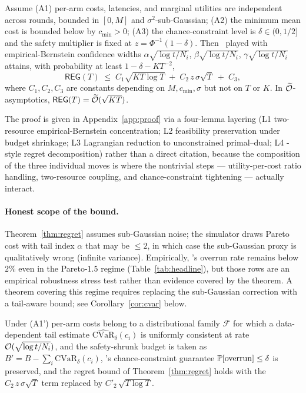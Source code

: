 \begin{theorem}
\label{thm:regret}
Assume
(A1) per-arm costs, latencies, and marginal utilities are independent
across rounds, bounded in $[0, M]$ and $\sigma^2$-sub-Gaussian;
(A2) the minimum mean cost is bounded below by $c_{\min} > 0$;
(A3) the chance-constraint level is $\delta \in (0, 1/2]$ and the
safety multiplier is fixed at $z = \Phi^{-1}(1-\delta)$.
Then \CBUC~played with empirical-Bernstein confidence widths
$\alpha\sqrt{\log t/N_i}$, $\beta\sqrt{\log t/N_i}$,
$\gamma\sqrt{\log t/N_i}$ attains, with probability at least
$1 - \delta - K T^{-2}$,
\[
  \mathsf{REG}(T)
   \;\le\; C_1 \sqrt{K T \log T}
        \;+\; C_2\, z\, \sigma \sqrt{T}
        \;+\; C_3,
\]
where $C_1, C_2, C_3$ are constants depending on $M, c_{\min}, \sigma$
but not on $T$ or $K$. In $\widetilde{\mathcal{O}}$-asymptotics, $\mathsf{REG}(T)
 = \widetilde{\mathcal{O}}(\sqrt{KT})$.
\end{theorem}

The proof is given in Appendix~\ref{app:proof} via a four-lemma
layering (L1 two-resource empirical-Bernstein concentration;
L2 feasibility preservation under budget shrinkage; L3 Lagrangian
reduction to unconstrained primal--dual; L4 \BwK-style regret
decomposition) rather than a direct \cite{bwk2018} citation, because
the composition of the three individual moves is where the nontrivial
steps — utility-per-cost ratio handling, two-resource coupling, and
chance-constraint tightening — actually interact.

\paragraph{Honest scope of the bound.}
Theorem~\ref{thm:regret} assumes sub-Gaussian noise; the simulator
draws Pareto cost with tail index $\alpha$ that may be $\le 2$, in
which case the sub-Gaussian proxy is qualitatively wrong (infinite
variance). Empirically, \CBUC's overrun rate remains below $2\%$ even
in the Pareto-$1.5$ regime (Table~\ref{tab:headline}), but those rows
are an empirical robustness stress test rather than evidence covered
by the theorem. A theorem covering this regime requires replacing the
sub-Gaussian correction with a tail-aware bound; see
Corollary~\ref{cor:cvar} below.

\begin{corollary}
\label{cor:cvar}
Under (A1') per-arm costs belong to a distributional family
$\mathcal{F}$ for which a data-dependent tail estimate
$\widehat{\mathrm{CVaR}}_{\delta}(c_i)$ is uniformly consistent at rate
$\mathcal{O}(\sqrt{\log t / N_i})$, and the safety-shrunk budget is taken as
$B' = B - \sum_i \widehat{\mathrm{CVaR}}_{\delta}(c_i)$,
\CBUC's chance-constraint guarantee $\mathbb{P}[\text{overrun}] \le \delta$
is preserved, and the regret bound of Theorem~\ref{thm:regret} holds
with the $C_2\, z\,\sigma\sqrt{T}$ term replaced by
$C'_2\,\sqrt{T \log T}$.
\end{corollary}

